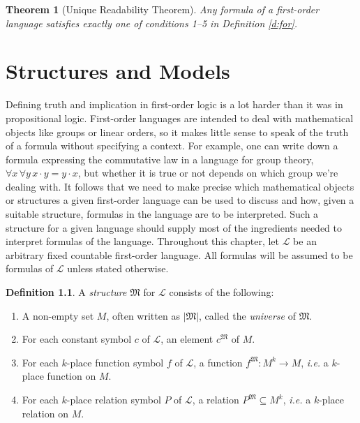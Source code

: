 \documentclass[12pt]{amsbook}
\theoremstyle{plain}
\newtheorem{thm}{Theorem}[chapter]
\theoremstyle{definition}
\newtheorem{defn}{Definition}[chapter]
\theoremstyle{remark}
\begin{document}
\begin{thm}[Unique Readability Theorem] \label{t:urf}    
Any formula of a first-order language satisfies exactly one of conditions 1--5 in Definition \ref{d:for}.
\end{thm}


%
%

\chapter{Structures and Models} \label{ch:six}

Defining truth and implication in first-order logic is a lot harder than it was in propositional logic.  First-order languages are intended to deal with mathematical objects like groups or linear orders,  so it makes little sense to speak of the truth of a formula without specifying a context.  For example,  one can write down a formula expressing the commutative law in a language for group theory,  $\forall x\, \forall y\, x \cdot y = y \cdot x$,  but whether it is true or not depends on which group we're dealing with.  It follows that we need to make precise which mathematical objects or structures a given first-order language can be used to discuss and how,  given a suitable structure,  formulas in the language are to be interpreted.  Such a structure for a given language should supply most of the ingredients needed to interpret formulas of the language.  
Throughout this chapter,  let $\mathcal{L}$ be an arbitrary fixed countable first-order language.  All formulas will be assumed to be formulas of $\mathcal{L}$ unless stated otherwise.

\begin{defn} \label{d:str} 
A {\em structure\/} $\mathfrak{M}$ for $\mathcal{L}$ consists of the following:
\begin{enumerate}
\item A non-empty set $M$,  often written as $|\mathfrak{M}|$,  called the {\em universe\/} of $\mathfrak{M}$.
\item For each constant symbol $c$ of $\mathcal{L}$,  an element $c^{\mathfrak{M}}$ of $M$.
\item For each $k$-place function symbol $f$ of $\mathcal{L}$,  a function $f^{\mathfrak{M}} : M^k \to M$,  {\em i.e.\/} a $k$-place function on $M$.
\item For each $k$-place relation symbol $P$ of $\mathcal{L}$,  a relation $P^{\mathfrak{M}} \subseteq M^k$,  {\em i.e.\/} a $k$-place relation on $M$.
\end{enumerate}
\end{defn}
\end{document}
